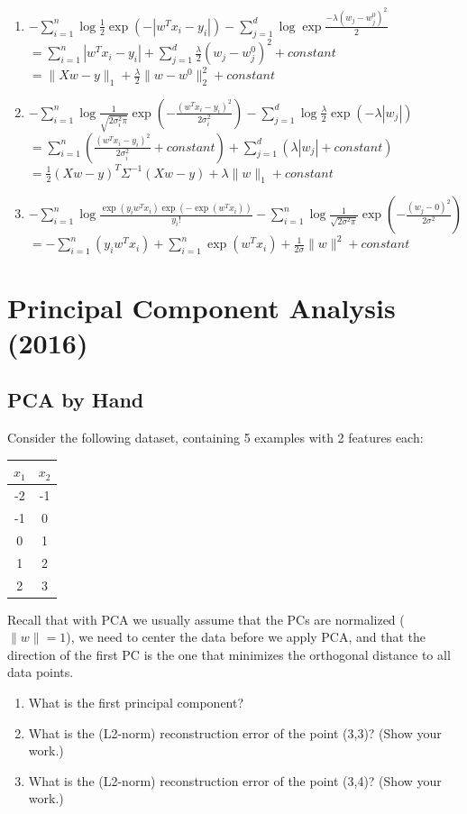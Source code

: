 \documentclass{article}
\def\blu#1{{\color{blu}#1}}
\def\norm#1{\|#1\|}
\def\enum#1{\begin{enumerate}#1\end{enumerate}}
\begin{document}
\enum{
\item $-\sum_{i=1}^n\log   \frac 1 2 \exp(-|w^Tx_i - y_i|)  -\sum_{j=1}^d\log \exp \frac{-\lambda(w_j -  w^0_j)^2}{2}$ \\
        $ =  \sum_{i=1}^n |w^Tx_i - y_i| +\sum_{j=1}^d  \frac{\lambda}{2}(w_j -  w^0_j)^2 + constant$\\
       $= \norm{Xw-y}_1 +  \frac{\lambda}{2} \norm{w -  w^0}^2_2 + constant$
\item  $-\sum_{i=1}^n\log  \frac{1}{\sqrt{2\sigma_i^2\pi}}\exp\left(-\frac{(w^Tx_i - y_i)^2}{2\sigma_i^2}\right) -\sum_{j=1}^d\log \frac{\lambda}{2}\exp(-\lambda|w_j|)  $\\
       $  =\sum_{i=1}^n( \frac{(w^Tx_i - y_i)^2}{2\sigma_i^2}+ constant) +  \sum_{j=1}^d (\lambda|w_j| +constant) $\\
       $ = \frac{1}{2}(Xw-y)^T \Sigma^{-1} (Xw-y) +\lambda\norm{w}_1+ constant $
\item  $-\sum_{i=1}^n\log  \frac{\exp(y_iw^Tx_i)\exp(-\exp(w^Tx_i))}{y_i!} -\sum_{i=1}^n \log  \frac{1}{\sqrt{2\sigma^2\pi}}\exp\left(-\frac{(w_j - 0)^2}{2\sigma^2}\right)$\\
        $= -\sum_{i=1}^n (y_iw^Tx_i) + \sum_{i=1}^n \exp(w^Tx_i) +\frac{1}{2\sigma}\norm{w}^2+ constant$
}


\section{Principal Component Analysis (2016)}

\subsection{PCA by Hand}

Consider the following dataset, containing 5 examples with 2 features each:
\begin{center}
\begin{tabular}{cc}
$x_1$ & $x_2$\\
\hline
-2 & -1\\
-1 & 0\\
0 & 1\\
1 & 2\\
2 & 3\\
\end{tabular}
\end{center}
Recall that with PCA we usually assume that the PCs are normalized ($\norm{w} = 1$), we need to center the data before we apply PCA, and that the direction of the first PC is the one that minimizes the orthogonal distance to all data points.
\blu{
\enum{
\item What is the first principal component?
\item What is the (L2-norm) reconstruction error of the point (3,3)? (Show your work.)
\item What is the (L2-norm) reconstruction error of the point (3,4)? (Show your work.)
}
}
\end{document}
